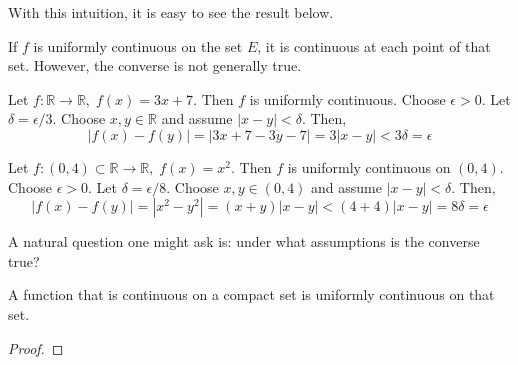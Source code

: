   With this intuition, it is easy to see the result below. 

  \begin{lemma}
    If $f$ is uniformly continuous on the set $E$, it is continuous at each point of that set. However, the converse is not generally true. 
  \end{lemma}

  \begin{example}
    Let $f: \mathbb{R} \longrightarrow \mathbb{R}, \; f(x) = 3x+7$. Then $f$ is uniformly continuous. Choose $\epsilon > 0$. Let $\delta = \epsilon / 3$. Choose $x, y \in \mathbb{R}$ and assume $|x-y| < \delta$. Then, 
    \begin{equation}
      | f(x) - f(y) | = | 3x + 7 - 3 y - 7 | = 3 |x-y| < 3 \delta = \epsilon
    \end{equation}
  \end{example}

  \begin{example}
    Let $f: (0, 4) \subset \mathbb{R} \longrightarrow \mathbb{R}, \; f(x) = x^2$. Then $f$ is uniformly continuous on $(0, 4)$. Choose $\epsilon > 0$. Let $\delta = \epsilon / 8$. Choose $x, y \in (0, 4)$ and assume $|x-y| < \delta$. Then, 
    \begin{equation}
      |f(x) - f(y)| = |x^2 - y^2| = (x+y) |x-y| < (4+4) |x-y| = 8\delta = \epsilon
    \end{equation}
  \end{example}

  A natural question one might ask is: under what assumptions is the converse true?  

  \begin{theorem}
    A function that is continuous on a compact set is uniformly continuous on that set. 
  \end{theorem}
  \begin{proof}
    
  \end{proof} 

